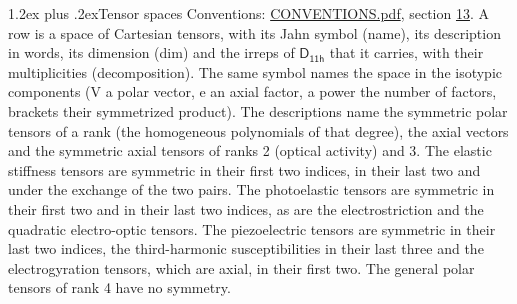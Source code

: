 \documentclass[10pt,a4paper]{article}
\makeatletter
\renewcommand\section{\@startsection{section}{1}{\z@}{-3ex plus -1ex minus -.2ex}%
  {1.2ex plus .2ex}{\normalfont\large\sffamily\bfseries\color{parttitle}}}
\numberwithin{equation}{section}
\newcommand{\grp}[1]{\mathsf{#1}}
\makeatother
\begin{document}
\section{Tensor spaces}\label{s:tensor_spaces}
Conventions: \href{../../CONVENTIONS.pdf}{CONVENTIONS.pdf}, section \href{../../CONVENTIONS.pdf\#conv.13}{13}.
\leavevmode\label{n:head.name}\label{n:head.description}\label{n:head.dim}\label{n:head.decomposition}A row is a space of Cartesian tensors, with its Jahn symbol (name), its description in words, its dimension (dim) and the irreps of $\grp{D_{11h}}$ that it carries, with their multiplicities (decomposition). \label{n:label.jahn}The same symbol names the space in the isotypic components (V a polar vector, e an axial factor, a power the number of factors, brackets their symmetrized product). The descriptions name the symmetric polar tensors of a rank (the homogeneous polynomials of that degree), the axial vectors and the symmetric axial tensors of ranks 2 (optical activity) and 3. The elastic stiffness tensors are symmetric in their first two indices, in their last two and under the exchange of the two pairs. The photoelastic tensors are symmetric in their first two and in their last two indices, as are the electrostriction and the quadratic electro-optic tensors. The piezoelectric tensors are symmetric in their last two indices, the third-harmonic susceptibilities in their last three and the electrogyration tensors, which are axial, in their first two. The general polar tensors of rank 4 have no symmetry.
\end{document}
